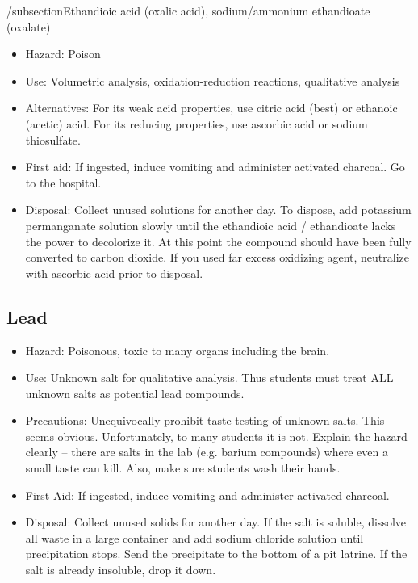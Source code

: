 /subsection{Ethandioic acid (oxalic acid), 
sodium/ammonium ethandioate (oxalate)}
\begin{itemize}
\item{Hazard: Poison}
\item{Use: Volumetric analysis, 
oxidation-reduction reactions, qualitative analysis}
\item{Alternatives: For its weak acid properties, 
use citric acid (best) or ethanoic (acetic) acid. 
For its reducing properties, use ascorbic acid or sodium thiosulfate.}
\item{First aid: If ingested, induce vomiting 
and administer activated charcoal. Go to the hospital.}
\item{Disposal: Collect unused solutions for another day. 
To dispose, add potassium permanganate solution slowly 
until the ethandioic acid / ethandioate lacks the power to decolorize it. 
At this point the compound should have been fully converted to carbon dioxide. 
If you used far excess oxidizing agent, 
neutralize with ascorbic acid prior to disposal.}
\end{itemize}

\subsection{Lead}
\begin{itemize}
\item{Hazard: Poisonous, toxic to many organs including the brain.}
\item{Use: Unknown salt for qualitative analysis. 
Thus students must treat ALL unknown salts as potential lead compounds.}
\item{Precautions: Unequivocally prohibit taste-testing of unknown salts. 
This seems obvious. 
Unfortunately, to many students it is not. 
Explain the hazard clearly -- 
there are salts in the lab (e.g. barium compounds) 
where even a small taste can kill. 
Also, make sure students wash their hands.}
\item{First Aid: If ingested, 
induce vomiting and administer activated charcoal.}
\item{Disposal: Collect unused solids for another day. 
If the salt is soluble, 
dissolve all waste in a large container 
and add sodium chloride solution until precipitation stops. 
Send the precipitate to the bottom of a pit latrine. 
If the salt is already insoluble, drop it down.}
\end{itemize}

